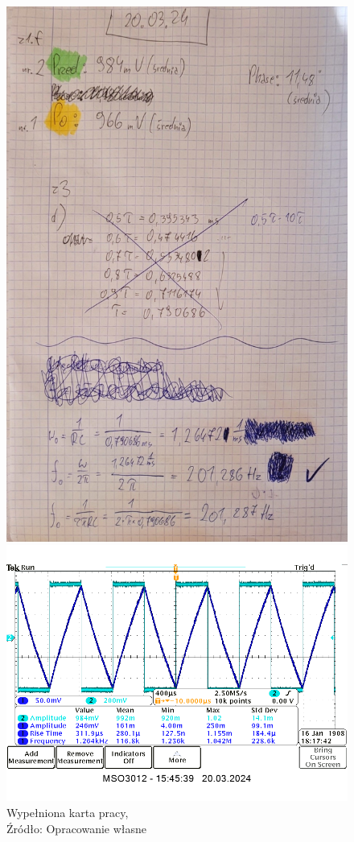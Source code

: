 \documentclass{article}
\begin{document}
    \begin{figure}[!ht]
      \centering
      \begin{minipage}{.4\textwidth}
        \centering
        \includegraphics[scale=0.15]{grafiki/notatki_1.jpg}
        \caption{Wypełniona karta pracy,
          \\Źródło: Opracowanie własne}
      \end{minipage}
      \begin{minipage}{.4\textwidth}
        \centering
        \includegraphics[scale=0.3]{grafiki/1t.png}

\end{minipage}
\end{figure}
\end{document}
